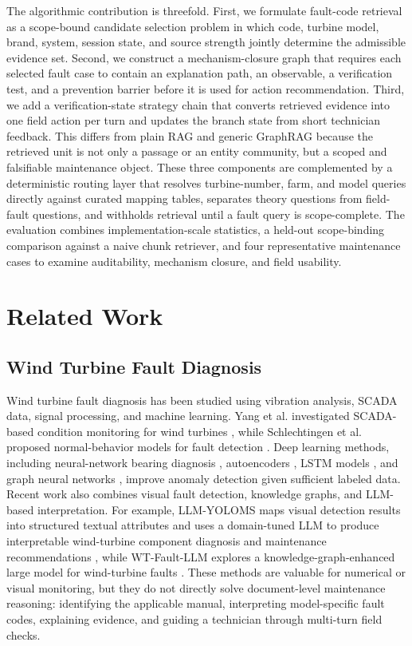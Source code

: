 \documentclass[lettersize,journal]{IEEEtran}
\begin{document}
The algorithmic contribution is threefold. First, we formulate fault-code retrieval as a scope-bound candidate selection problem in which code, turbine model, brand, system, session state, and source strength jointly determine the admissible evidence set. Second, we construct a mechanism-closure graph that requires each selected fault case to contain an explanation path, an observable, a verification test, and a prevention barrier before it is used for action recommendation. Third, we add a verification-state strategy chain that converts retrieved evidence into one field action per turn and updates the branch state from short technician feedback. This differs from plain RAG and generic GraphRAG because the retrieved unit is not only a passage or an entity community, but a scoped and falsifiable maintenance object. These three components are complemented by a deterministic routing layer that resolves turbine-number, farm, and model queries directly against curated mapping tables, separates theory questions from field-fault questions, and withholds retrieval until a fault query is scope-complete. The evaluation combines implementation-scale statistics, a held-out scope-binding comparison against a naive chunk retriever, and four representative maintenance cases to examine auditability, mechanism closure, and field usability.

\section{Related Work}
\subsection{Wind Turbine Fault Diagnosis}
Wind turbine fault diagnosis has been studied using vibration analysis, SCADA data, signal processing, and machine learning. Yang et al. investigated SCADA-based condition monitoring for wind turbines \cite{yang2009wind}, while Schlechtingen et al. proposed normal-behavior models for fault detection \cite{schlechtingen2013wind}. Deep learning methods, including neural-network bearing diagnosis \cite{bangalore2015artificial}, autoencoders \cite{shao2018novel}, LSTM models \cite{chen2020fault}, and graph neural networks \cite{li2022graph}, improve anomaly detection given sufficient labeled data. Recent work also combines visual fault detection, knowledge graphs, and LLM-based interpretation. For example, LLM-YOLOMS maps visual detection results into structured textual attributes and uses a domain-tuned LLM to produce interpretable wind-turbine component diagnosis and maintenance recommendations \cite{li2025llmyoloms}, while WT-Fault-LLM explores a knowledge-graph-enhanced large model for wind-turbine faults \cite{wang2025wtfaultllm}. These methods are valuable for numerical or visual monitoring, but they do not directly solve document-level maintenance reasoning: identifying the applicable manual, interpreting model-specific fault codes, explaining evidence, and guiding a technician through multi-turn field checks.
\end{document}
